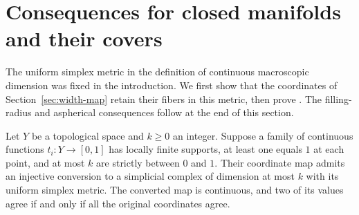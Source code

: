 \section{Consequences for closed manifolds and their covers}
\label{sec:closed-covers}

The uniform simplex metric in the definition of continuous macroscopic
dimension was fixed in the introduction. We first show that the
coordinates of Section~\ref{sec:width-map} retain their fibers in this
metric, then prove . The filling-radius and
aspherical consequences follow at the end of this section.

\begin{lemma}
\label{cover:uniform}
Let $Y$ be a topological space and $k\ge0$ an integer. Suppose a
family of continuous functions $t_i:Y\to[0,1]$ has locally finite
supports, at least one equals $1$ at each point, and at most $k$ are
strictly between $0$ and $1$.  Their coordinate map admits an injective
conversion to a simplicial complex of dimension at most $k$ with its
uniform simplex metric.  The converted map is continuous, and two of
its values agree if and only if all the original coordinates agree.
\end{lemma}
